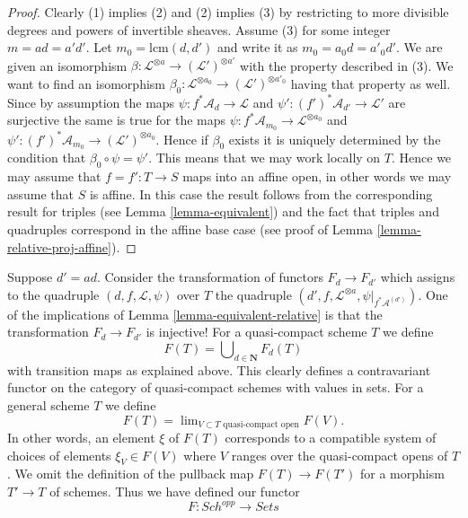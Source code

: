 \documentclass{stacks-project}
\theoremstyle{plain}
\theoremstyle{definition}
\theoremstyle{remark}
\numberwithin{equation}{subsection}
\def\lim{\mathop{\mathrm{lim}}\nolimits}
\def\Sch{\mathit{Sch}}
\begin{document}
\begin{proof}
Clearly (1) implies (2) and (2) implies (3) by restricting to
more divisible degrees and powers of invertible sheaves.
Assume (3) for some integer $m = ad = a'd'$. Let
$m_0 = \text{lcm}(d, d')$ and write it as $m_0 = a_0d = a'_0d'$.
We are given an isomorphism
$\beta : \mathcal{L}^{\otimes a} \to (\mathcal{L}')^{\otimes a'}$
with the property described in (3). We want to find an isomorphism
$\beta_0 : \mathcal{L}^{\otimes a_0} \to (\mathcal{L}')^{\otimes a'_0}$
having that property as well.
Since by assumption the maps $\psi : f^*\mathcal{A}_d \to \mathcal{L}$
and $\psi' : (f')^*\mathcal{A}_{d'} \to \mathcal{L}'$ are surjective the
same is true for the maps
$\psi : f^*\mathcal{A}_{m_0} \to \mathcal{L}^{\otimes a_0}$
and $\psi' : (f')^*\mathcal{A}_{m_0} \to (\mathcal{L}')^{\otimes a_0}$.
Hence if $\beta_0$ exists it is uniquely determined by the
condition that $\beta_0 \circ \psi = \psi'$. This means that
we may work locally on $T$. Hence we may assume that
$f = f' : T \to S$ maps into an affine open, in other words
we may assume that $S$ is affine. In this case the result follows
from the corresponding result for triples (see Lemma \ref{lemma-equivalent})
and the fact that triples and quadruples correspond in the
affine base case (see proof of Lemma \ref{lemma-relative-proj-affine}).
\end{proof}

\noindent
Suppose $d' = ad$. Consider the transformation of functors $F_d \to F_{d'}$
which assigns to the quadruple $(d, f, \mathcal{L}, \psi)$ over
$T$ the quadruple
$(d', f, \mathcal{L}^{\otimes a}, \psi|_{f^*\mathcal{A}^{(d')}})$.
One of the implications of Lemma \ref{lemma-equivalent-relative} is that the
transformation $F_d \to F_{d'}$ is injective!
For a quasi-compact scheme $T$ we define
$$
F(T) = \bigcup\nolimits_{d \in \mathbf{N}} F_d(T)
$$
with transition maps as explained above. This clearly defines a
contravariant functor on the category of quasi-compact schemes
with values in sets. For a general scheme
$T$ we define
$$
F(T)
=
\lim_{V \subset T\text{ quasi-compact open}} F(V).
$$
In other words, an element $\xi$ of $F(T)$ corresponds to a compatible system
of choices of elements $\xi_V \in F(V)$ where $V$ ranges over the
quasi-compact opens of $T$.
We omit the definition of the pullback map $F(T) \to F(T')$
for a morphism $T' \to T$ of schemes.
Thus we have defined our functor
\begin{equation}
\label{equation-proj}
F : \Sch^{opp} \longrightarrow \textit{Sets}
\end{equation}
\end{document}
